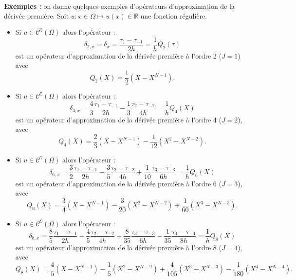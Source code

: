 \textbf{Exemples :}
on donne quelques exemples d'opérateurs d'approximation de la dérivée première. Soit $u :  x \in \Omega \mapsto u(x) \in \mathbb{R}$ une fonction régulière. 
\begin{itemize}
\item Si $u \in \mathcal{C}^3 (\Omega)$ alors l'opérateur :
\begin{equation}
\delta_{2,x} = \delta_x = \dfrac{\tau_1 - \tau_{-1}}{2h} = \dfrac{1}{h}Q_2(\tau)
\label{eq:derprem_order2}
\end{equation}
est un opérateur d'approximation de la dérivée première à l'ordre 2 ($J=1$) avec 
\begin{equation}
Q_2(X) = \dfrac{1}{2}(X-X^{N-1}).
\end{equation}
\item Si $u \in \mathcal{C}^5 (\Omega)$ alors l'opérateur :
\begin{equation}
\delta_{4,x} = \dfrac{4}{3} \dfrac{\tau_1 - \tau_{-1}}{2h} - \dfrac{1}{3} \dfrac{\tau_2 - \tau_{-2}}{4h} = \dfrac{1}{h}Q_4(X)
\label{eq:derprem_order4}
\end{equation}
est un opérateur d'approximation de la dérivée première à l'ordre 4 ($J=2$), avec
\begin{equation}
Q_4(X) = \dfrac{2}{3} (X-X^{N-1}) - \dfrac{1}{12} (X^2-X^{N-2}).
\end{equation}
\item Si $u \in \mathcal{C}^7 (\Omega)$ alors l'opérateur :
\begin{equation}
\delta_{6,x} = \dfrac{3}{2} \dfrac{\tau_1 - \tau_{-1}}{2h} - \dfrac{3}{5} \dfrac{\tau_2 - \tau_{-2}}{4h} + \dfrac{1}{10} \dfrac{\tau_3 - \tau_{-3}}{6h} = \dfrac{1}{h} Q_6(X)
\label{eq:derprem_order6}
\end{equation}
est un opérateur d'approximation de la dérivée première à l'ordre 6 ($J=3$), avec
\begin{equation}
Q_6(X) = \dfrac{3}{4} (X-X^{N-1}) - \dfrac{3}{20} (X^2-X^{N-2}) + \dfrac{1}{60} (X^3-X^{N-3}).
\end{equation}
\item Si $u \in \mathcal{C}^9 (\Omega)$ alors l'opérateur :
\begin{equation}
\delta_{8,x} = \dfrac{8}{5} \dfrac{\tau_1 - \tau_{-1}}{2h} - \dfrac{4}{5} \dfrac{\tau_2 - \tau_{-2}}{4h} + \dfrac{8}{35} \dfrac{\tau_3 - \tau_{-3}}{6h} - \dfrac{1}{35} \dfrac{\tau_4 - \tau_{-4}}{8h} = \dfrac{1}{h}Q_8(X)
\label{eq:derprem_order8}
\end{equation}
est un opérateur d'approximation de la dérivée première à l'ordre 8 ($J=4$), avec
\begin{equation}
Q_8(X) = \dfrac{4}{5} (X-X^{N-1}) - \dfrac{1}{5} (X^2-X^{N-2}) + \dfrac{4}{105} (X^3-X^{N-3}) - \dfrac{1}{180} (X^4-X^{N-4}).
\end{equation}
\end{itemize}


